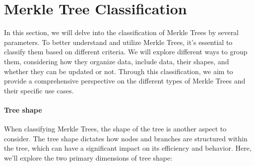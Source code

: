 \section{Merkle Tree Classification}

In this section, we will delve into the classification of Merkle Trees by several parameters. To better understand and utilize Merkle Trees, it's essential to classify them based on different criteria. We will explore different ways to group them, considering how they organize data, include data, their shapes, and whether they can be updated or not. Through this classification, we aim to provide a comprehensive perspective on the different types of Merkle Trees and their specific use cases.




\paragraph*{Tree shape}

When classifying Merkle Trees, the shape of the tree is another aspect to consider. The tree shape dictates how nodes and branches are structured within the tree, which can have a significant impact on its efficiency and behavior. Here, we'll explore the two primary dimensions of tree shape:

